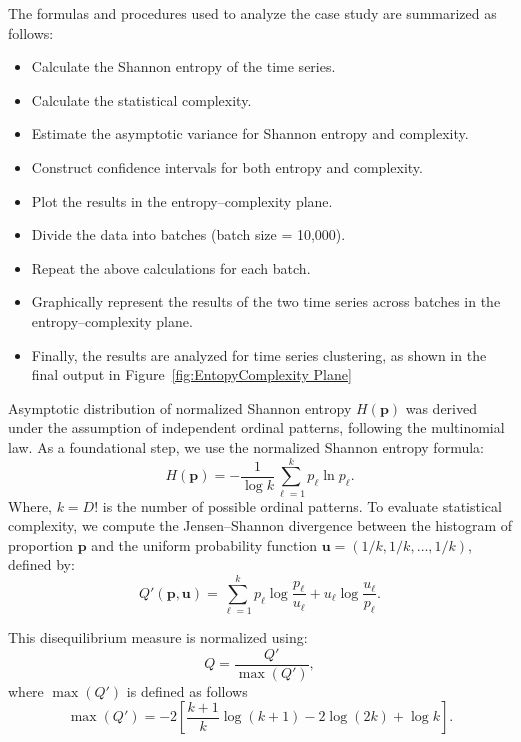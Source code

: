 The formulas and procedures used to analyze the case study are summarized as follows:
\begin{itemize}
	\item Calculate the Shannon entropy of the time series.
	\item Calculate the statistical complexity.
	\item Estimate the asymptotic variance for Shannon entropy and complexity.
	\item Construct confidence intervals for both entropy and complexity.
	\item Plot the results in the entropy–complexity plane.
	\item Divide the data into batches (batch size = 10,000).
	\item Repeat the above calculations for each batch.
	\item Graphically represent the results of the two time series across batches in the entropy–complexity plane.
	\item Finally, the results are analyzed for time series clustering, as shown in the final output in Figure~\ref{fig:EntopyComplexity Plane}
\end{itemize}


Asymptotic distribution of normalized Shannon entropy $H(\mathbf{p})$ was derived under the assumption of independent ordinal patterns, following the multinomial law. As a foundational step, we use the normalized Shannon entropy formula: 
\begin{equation}
	H(\mathbf{p})=-\dfrac{1}{\log k}\sum^{k}_{\ell=1}p_{\ell} \ln{p_{\ell}}.
\end{equation}
Where, $k=D!$ is the number of possible ordinal patterns. To evaluate statistical complexity, we compute the Jensen–Shannon divergence between the histogram of proportion $\mathbf{p}$ and the uniform probability function $\mathbf{u}=(1/k, 1/k, \dots, 1/k)$, defined by:  
\begin{equation}
	Q'(\mathbf{p,u})=\sum^k_{\ell=1} p_\ell\log\dfrac{p_\ell}{u_\ell}+u_\ell\log\dfrac{u_\ell}{p_\ell}.
\end{equation}

This disequilibrium measure is normalized using:
\begin{equation}
	Q=\dfrac{Q'}{\max{(Q')}},
\end{equation}
where $\max(Q')$ is defined as follows
\begin{equation}
	\max(Q')=-2 \left[\dfrac{k+1}{k}\log(k+1)-2\log(2k)+\log k\right].
\end{equation}

